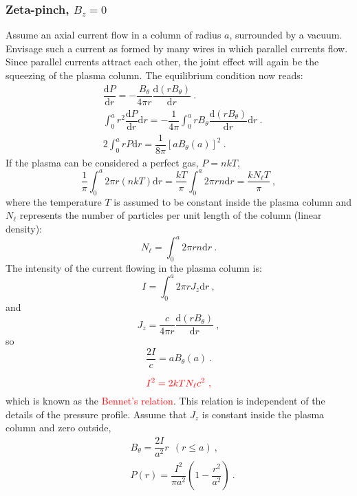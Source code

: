\documentclass[12pt,a4paper]{article}
\newcommand{\dif}{\mathrm{d}}
\begin{document}
\subsubsection{Zeta-pinch, $B_z = 0$}
Assume an axial current flow in a column of radius $a$, surrounded by a vacuum. Envisage such a current as formed by many wires in which parallel currents flow. Since parallel currents attract each other, the joint effect will again be the squeezing of the plasma column. The equilibrium condition now reads:
\begin{align}
& \dfrac{\dif P}{\dif r} = -\dfrac{B_\theta}{4\pi r} \dfrac{\dif (rB_\theta)}{\dif r} ~. \\
\nonumber & \int_0^a r^2 \dfrac{\dif P}{\dif r} \dif r = -\dfrac{1}{4\pi} \int_0^a r B_\theta  \dfrac{\dif (rB_\theta)}{\dif r} \dif r ~. \\
\nonumber & 2\int_0^a rP \dif r = \dfrac{1}{8\pi} [aB_\theta(a)]^2 ~.
\end{align}
If the plasma can be considered a perfect gas, $P = nkT$, 
\begin{equation*}
\dfrac{1}{\pi} \int_0^a 2\pi r(nkT) \dif r = \dfrac{kT}{\pi} \int_0^a 2\pi r n \dif r = \dfrac{kN_\ell T}{\pi} ~,
\end{equation*}
where the temperature $T$ is assumed to be constant inside the plasma column and $N_\ell$ represents the number of particles per unit length of the column (linear density):
\begin{equation*}
N_\ell = \int_0^a 2\pi r n \dif r ~.
\end{equation*}
The intensity of the current flowing in the plasma column is:
\begin{equation*}
I = \int_0^a 2\pi r J_z \dif r ~,
\end{equation*}
and
\begin{equation*}
J_z = \dfrac{c}{4\pi r} \dfrac{\dif (rB_\theta)}{\dif r} ~,
\end{equation*}
so
\begin{equation*}
\dfrac{2I}{c} = aB_\theta(a) ~.
\end{equation*}

\begin{equation*}
\color{red} I^2 = 2kT N_\ell c^2 ~,
\end{equation*}
which is known as the \textcolor{red}{Bennet's relation}. This relation is independent of the details of the pressure profile. Assume that $J_z$ is constant inside the plasma column and zero outside,
\begin{align*}
& B_\theta = \dfrac{2I}{a^2} r ~~ (r \leqslant a) ~, \\
& P(r) = \dfrac{I^2}{\pi a^2} \left(1 - \dfrac{r^2}{ a^2} \right) ~.
\end{align*}
\end{document}
